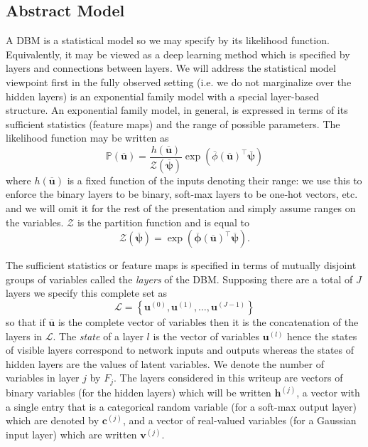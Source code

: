 \documentclass{article} %
\begin{document}
\subsection{Abstract Model}

A DBM is a statistical model so we may specify by its likelihood function. Equivalently, it may be viewed as a deep learning
method which is specified by layers and connections between layers.  We will address the statistical model viewpoint first  in the fully observed setting (i.e. we do not marginalize over the hidden layers) is an exponential family model with a special
layer-based structure.  An exponential family model, in general, is expressed in terms of its sufficient statistics (feature maps)
and the range of possible parameters.  The likelihood function may be written as 
\begin{equation}\label{eq:exponential-likelihood-function}
\mathbb{P}(\overline{\mathbf{u}}) = \frac{h(\overline{\mathbf{u}})}{\mathcal{Z}(\overline{\boldsymbol{\psi}})}\exp( \overline{\phi}(\overline{\mathbf{u}})^\top \overline{\boldsymbol{\psi}})
\end{equation}
where $h(\overline{\mathbf{u}})$ is a fixed function of the inputs denoting their range: we use this to enforce the binary layers to be
binary, soft-max layers to be one-hot vectors, etc. and we will omit it for the rest of the presentation and simply assume ranges
on the variables.
  $\mathcal{Z}$ is the partition function and is equal to 
\begin{equation}
\mathcal{Z}(\overline{\boldsymbol{\psi}}) = \exp( \overline{\boldsymbol{\phi}}(\overline{\mathbf{u}})^\top \overline{\boldsymbol{\psi}}).
\end{equation}

The sufficient statistics or feature maps is specified in terms of
mutually disjoint groups of variables called the {\it layers} of the
DBM. Supposing there are a total of $J$ layers we specify this complete set as
\begin{equation}
\mathcal{L}=\left\{\mathbf{u}^{(0)},\mathbf{u}^{(1)},\ldots,\mathbf{u}^{(J-1)}\right\}
\end{equation}
so that if $\overline{\mathbf{u}}$ is the complete vector of variables then it is the concatenation
of the layers in $\mathcal{L}$.  The {\it state} of a layer $l$ is the vector of variables
$\mathbf{u}^{(l)}$ hence the states of visible layers correspond to network inputs and outputs whereas
the states of hidden layers are the values of latent variables.  We denote the number of variables in layer $j$ by 
$F_j$. The layers considered in this writeup
are vectors of binary variables (for the hidden layers) which will be written $\mathbf{h}^{(j)}$, 
a vector with a single entry that is a categorical random variable (for a soft-max output layer) which are denoted by $\mathbf{c}^{(j)}$,
and a vector of real-valued variables (for a Gaussian input layer) which are written $\mathbf{v}^{(j)}$.
\end{document}
